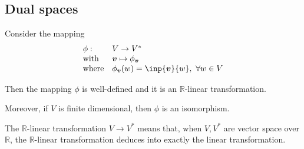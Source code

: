 \subsection{Dual spaces}

\begin{theorem}
Consider the mapping
\[
\begin{array}{ll}
\phi:&V\to V^*\\
\text{with}&\bm v\mapsto\phi_{\bm v}\\
\text{where}&\phi_{\bm v}(w)=\inp{\bm v}{w},\ \forall w\in V
\end{array}
\]

Then the mapping $\phi$ is well-defined and it is an $\mathbb{R}$-linear transformation.

Moreover, if $V$ is finite dimensional, then $\phi$ is an isomorphism.
\end{theorem}

The $\mathbb{R}$-linear transformation $V\to V^*$ means that, when $V,V^*$ are vector space over $\mathbb{R}$, the $\mathbb{R}$-linear transformation deduces into exactly the linear transformation.

